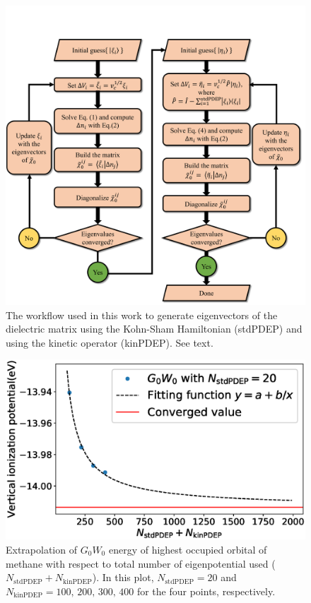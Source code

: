 \documentclass[aip,preprint]{revtex4-1}
\begin{document}
\begin{figure}
    \centering
    \includegraphics[width=0.8\linewidth]{fig/workflow.pdf}
    \caption{The workflow used in this work to generate eigenvectors of the dielectric matrix using the Kohn-Sham Hamiltonian (stdPDEP) and using the kinetic operator (kinPDEP). See text.}
    \label{fig:workflow}
\end{figure}

\begin{figure}
    \centering
    \includegraphics[width=0.6\linewidth]{fig/Fitting_example_of_CH4_from120.eps}
    \caption{Extrapolation of $G_0W_0$ energy of highest occupied orbital of methane with respect to total number of eigenpotential used ($N_\mathrm{stdPDEP}+N_\mathrm{kinPDEP}$). In this plot, $N_\mathrm{stdPDEP} = 20$ and $N_\mathrm{kinPDEP} = 100,\,200,\,300,\,400$ for the four points, respectively.}
    \label{fig:fitting_example}
\end{figure}
\end{document}
